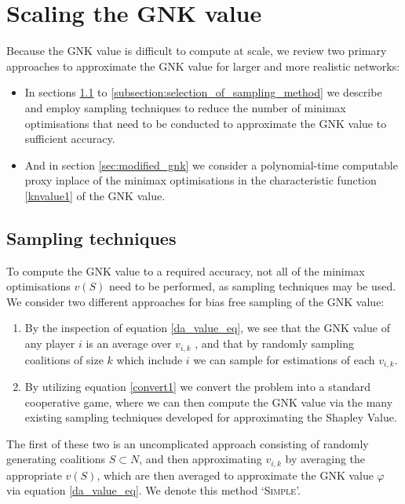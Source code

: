 \section{Scaling the GNK value}\label{sec:scaling}

Because the GNK value is difficult to compute at scale, we review two primary approaches to approximate the GNK value for larger and more realistic networks:

\begin{itemize}
    \item In sections \ref{sec:sampling_techniques} to \ref{subsection:selection_of_sampling_method} we describe and employ sampling techniques to reduce the number of minimax optimisations that need to be conducted to approximate the GNK value to sufficient accuracy.
    \item And in section \ref{sec:modified_gnk} we consider a polynomial-time computable proxy inplace of the minimax optimisations in the characteristic function \eqref{knvalue1} of the GNK value.
\end{itemize}

\subsection{Sampling techniques}\label{sec:sampling_techniques}
To compute the GNK value to a required accuracy, not all of the minimax optimisations $v(S)$ need to be performed, as sampling techniques may be used.
We consider two different approaches for bias free sampling of the GNK value:
\begin{enumerate}
    \item By the inspection of equation \ref{da_value_eq}, we see that the GNK value of any player $i$ is an average over $v_{i,k}$%
, and that by randomly sampling coalitions of size $k$ which include $i$ we can sample for estimations of each $v_{i,k}$.
    \item By utilizing equation \ref{convert1} we convert the problem into a standard cooperative game, where we can then compute the GNK value via the many existing sampling techniques developed for approximating the Shapley Value.
\end{enumerate}

The first of these two is an uncomplicated approach consisting of randomly generating coalitions $S\subset N$, %
and then approximating $v_{i,k}$ by averaging the appropriate $v(S)$, which are then averaged to approximate the GNK value $\varphi$ via equation \ref{da_value_eq}. We denote this method `\textsc{Simple}'.

